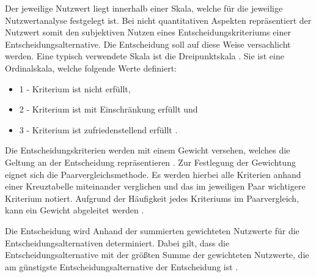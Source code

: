 Der jeweilige Nutzwert liegt innerhalb einer Skala, welche für die jeweilige Nutzwertanalyse festgelegt ist.
Bei nicht quantitativen Aspekten repräsentiert der Nutzwert somit den subjektiven Nutzen eines Entscheidungskriteriums einer Entscheidungsalternative.
Die Entscheidung soll auf diese Weise versachlicht werden.
Eine typisch verwendete Skala ist die Dreipunktskala \autocite[vgl.][S. 83ff.]{Kuhnapfel.2017}.
Sie ist eine Ordinalskala, welche folgende Werte definiert:
\begin{itemize}
	\item 1 - Kriterium ist nicht erfüllt, 
	\item 2 - Kriterium ist mit Einschränkung erfüllt und
	\item 3 - Kriterium ist zufriedenstellend erfüllt \autocite[vgl.][S. 86]{Kuhnapfel.2017}.
\end{itemize}

Die Entscheidungskriterien werden mit einem Gewicht versehen, welches die Geltung an der Entscheidung repräsentieren \autocite[vgl.][S. 78f.]{Kuhnapfel.2017}.
Zur Festlegung der Gewichtung eignet sich die Paarvergleichsmethode.
Es werden hierbei alle Kriterien anhand einer Kreuztabelle miteinander verglichen und das im jeweiligen Paar wichtigere Kriterium notiert.
Aufgrund der Häufigkeit jedes Kriteriums im Paarvergleich, kann ein Gewicht abgeleitet werden \autocite[vgl.][S. 81f.]{Kuhnapfel.2017}.

Die Entscheidung wird Anhand der summierten gewichteten Nutzwerte für die Entscheidungsalternativen determiniert.
Dabei gilt, dass die Entscheidungsalternative mit der größten Summe der gewichteten Nutzwerte, die am günstigste Entscheidungsalternative der Entscheidung ist \autocite[vgl.][S. 87f.]{Kuhnapfel.2017}.

%
